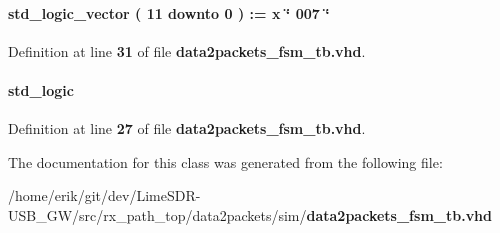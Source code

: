 \paragraph[{dut0\+\_\+smpl\+\_\+rd\+\_\+size}]{ {\bfseries \textcolor{comment}{std\+\_\+logic\+\_\+vector}\textcolor{vhdlchar}{ }\textcolor{vhdlchar}{(}\textcolor{vhdlchar}{ }\textcolor{vhdlchar}{ } \textcolor{vhdldigit}{11} \textcolor{vhdlchar}{ }\textcolor{keywordflow}{downto}\textcolor{vhdlchar}{ }\textcolor{vhdlchar}{ } \textcolor{vhdldigit}{0} \textcolor{vhdlchar}{ }\textcolor{vhdlchar}{)}\textcolor{vhdlchar}{ }\textcolor{vhdlchar}{ }\textcolor{vhdlchar}{ }\textcolor{vhdlchar}{\+:}\textcolor{vhdlchar}{=}\textcolor{vhdlchar}{ }\textcolor{vhdlchar}{ }\textcolor{vhdlchar}{x}\textcolor{vhdlchar}{ }\textcolor{keyword}{\char`\"{} 007 \char`\"{}}\textcolor{vhdlchar}{ }} \hspace{0.3cm}{\ttfamily [Signal]}}\label{classdata2packets__fsm__tb_1_1tb__behave_ae87c1e986cd835ef0b3af8bb78e57c71}


Definition at line {\bf 31} of file {\bf data2packets\+\_\+fsm\+\_\+tb.\+vhd}.

\paragraph[{reset\+\_\+n}]{ {\bfseries \textcolor{comment}{std\+\_\+logic}\textcolor{vhdlchar}{ }} \hspace{0.3cm}{\ttfamily [Signal]}}\label{classdata2packets__fsm__tb_1_1tb__behave_a1f070fd63a3a7fa45c907335ea870c5b}


Definition at line {\bf 27} of file {\bf data2packets\+\_\+fsm\+\_\+tb.\+vhd}.



The documentation for this class was generated from the following file\+:\begin{DoxyCompactItemize}
\item 
/home/erik/git/dev/\+Lime\+S\+D\+R-\/\+U\+S\+B\+\_\+\+G\+W/src/rx\+\_\+path\+\_\+top/data2packets/sim/{\bf data2packets\+\_\+fsm\+\_\+tb.\+vhd}\end{DoxyCompactItemize}
